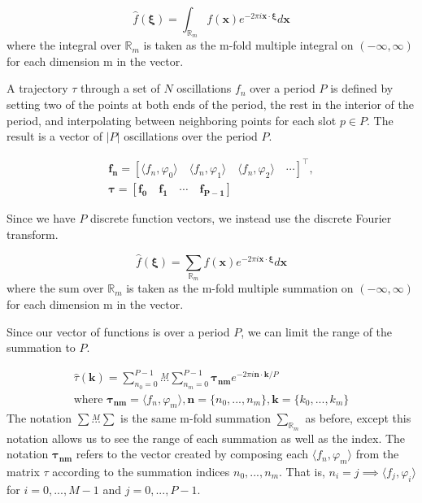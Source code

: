 \documentclass{MastersDoctoralThesis}
\begin{document}
\begin{equation}
  \label{Multidimensional Fourier Transform}
  \hat{f}(\bm{\xi}) = \int_{\mathbb{R}_m} f(\bm{x}) e^{-2 \pi i \bm{x} \cdot \bm{\xi}} d\bm{x}
\end{equation}
where the integral over $\mathbb{R}_m$ is taken as the m-fold multiple integral on $(-\infty, \infty)$ for each dimension m in the vector.

A trajectory $\tau$ through a set of $N$ oscillations $f_n$ over a period $P$ is defined by setting two of the points at both ends of the period, the rest in the interior of the period, and interpolating between neighboring points for each slot $p \in P$. The result is a vector of $|P|$ oscillations over the period $P$.  

\begin{equation}
\begin{gathered}
  \bm{f_n} = [ \langle f_n, \varphi_0 \rangle \quad \langle f_n, \varphi_1 \rangle \quad \langle f_n, \varphi_2 \rangle \quad \cdots ]^\top , \\
  \bm{\tau} = [ \bm{f_0} \quad \bm{f_1} \quad \cdots \quad \bm{f_{P-1}} ]
\end{gathered}
\end{equation}

Since we have $P$ discrete function vectors, we instead use the discrete Fourier transform.

\begin{equation}
  \hat{f}(\bm{\xi}) = \sum_{\mathbb{R}_m} f(\bm{x}) e^{-2 \pi i \bm{x} \cdot \bm{\xi}} d\bm{x}
\end{equation}
where the sum over $\mathbb{R}_m$ is taken as the m-fold multiple summation on $(-\infty, \infty)$ for each dimension m in the vector.

Since our vector of functions is over a period $P$, we can limit the range of the summation to $P$.

\begin{equation}
\begin{gathered}
  \hat{\tau}(\bm{k}) = \sum_{n_0 = 0}^{P-1} \overset{M}{...} \sum_{n_m = 0}^{P-1} \bm{\tau_{nm}} e^{-2 \pi i \bm{n} \cdot \bm{k} / P}  \\
  \text{where } \bm{\tau_{nm}} = \langle f_n, \varphi_m \rangle, \bm{n} = \{n_0, ..., n_m\}, \bm{k} = \{k_0, ..., k_m\}
\end{gathered}
\end{equation}
The notation $\sum \overset{M}{...} \sum$ is the same m-fold summation $\sum_{\mathbb{R}_m}$ as before, except this notation allows us to see the range of each summation as well as the index.
The notation $\bm{\tau_{nm}}$ refers to the vector created by composing each $\langle f_n, \varphi_m \rangle$ from the matrix $\tau$ according to the summation indices $n_0, ..., n_m$. That is, $n_i = j \implies \langle f_j, \varphi_i \rangle$ for $i = 0, ..., M-1$ and $j = 0, ..., P-1$. 
\end{document}
